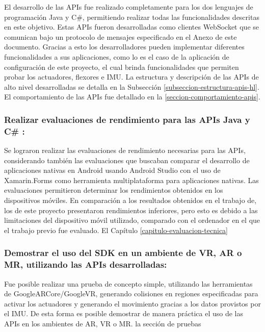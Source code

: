 El desarrollo de las APIs fue realizado completamente para los dos lenguajes de programación Java y C\#, permitiendo realizar todas las funcionalidades descritas en este objetivo. Estas APIs fueron desarrolladas como clientes WebSocket que se comunican bajo un protocolo de mensajes especificado en el Anexo de este documento. Gracias a esto los desarrolladores pueden implementar diferentes funcionalidades a sus aplicaciones, como lo es el caso de la aplicación de configuración de este proyecto, el cual brinda funcionalidades que permiten probar los actuadores, flexores e IMU. La estructura y descripción de las APIs de alto nivel desarrolladas se detalla en la Subsección \ref{subseccion-estructura-apis-hl}. El comportamiento de las APIs fue detallado en la \ref{seccion-comportamiento-apis}.


\subsubsection{Realizar evaluaciones de rendimiento para las APIs Java y C\# :} 
Se lograron realizar las evaluaciones de rendimiento necesarias para las APIs, considerando también las evaluaciones que buscaban comparar el desarrollo de aplicaciones nativas en Android usando Android Studio con el uso de Xamarin.Forms como herramienta multiplataforma para aplicaciones nativas. Las evaluaciones permitieron determinar los rendimientos obtenidos en los dispositivos móviles. En comparación a los resultados obtenidos en el trabajo de\cite{tesis-cerda-rodrigo}, los de este proyecto presentaron rendimientos inferiores, pero esto es debido a las limitaciones del dispositivo móvil utilizado, comparado con el ordenador en el que el trabajo previo fue evaluado. El Capítulo \ref{capitulo-evaluacion-tecnica}

\subsubsection{Demostrar el uso del SDK en un ambiente de VR, AR o MR, utilizando las APIs desarrolladas:}
Fue posible realizar una prueba de concepto simple, utilizando las herramientas de GoogleARCore/GoogleVR, generando colisiones en regiones especificadas para activar los actuadores y generando el movimiento gracias a los datos provistos por el IMU. De esta forma es posible demostrar de manera práctica el uso de las APIs en los ambientes de AR, VR o MR. la sección de pruebas 




